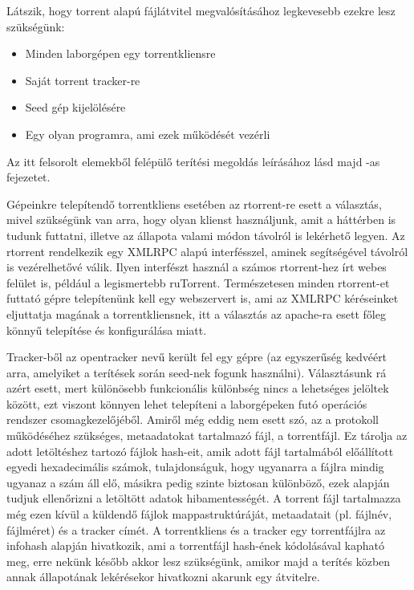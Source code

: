 Látszik, hogy torrent alapú fájlátvitel megvalósításához legkevesebb ezekre lesz szükségünk:
\begin{itemize}
	\item Minden laborgépen egy torrentkliensre
	\item Saját torrent tracker-re
	\item Seed gép kijelölésére
	\item Egy olyan programra, ami ezek működését vezérli
\end{itemize}
Az itt felsorolt elemekből felépülő terítési megoldás leírásához lásd majd -as fejezetet. 

Gépeinkre telepítendő torrentkliens esetében az rtorrent-re\cite{sundell2012libtorrent} esett a választás, mivel szükségünk van arra, hogy olyan klienst használjunk, amit a háttérben is tudunk futtatni, illetve az állapota valami módon távolról is lekérhető legyen. Az rtorrent rendelkezik egy XMLRPC\cite{merrick2006xml} alapú interfésszel, aminek segítségével távolról is vezérelhetővé válik. Ilyen interfészt használ a számos rtorrent-hez írt webes felület is, például a legismertebb ruTorrent\cite{rutorrent}. Természetesen minden rtorrent-et futtató gépre telepítenünk kell egy webszervert is, ami az XMLRPC kéréseinket eljuttatja magának a torrentkliensnek, itt a választás az apache-ra\cite{fielding1997apache} esett főleg könnyű telepítése és konfigurálása miatt.

Tracker-ből az opentracker nevű került fel egy gépre (az egyszerűség kedvéért arra, amelyiket a terítések során seed-nek fogunk használni). Választásunk rá azért esett, mert különösebb funkcionális különbség nincs a lehetséges jelöltek között, ezt viszont könnyen lehet telepíteni a laborgépeken futó operációs rendszer csomagkezelőjéből. Amiről még eddig nem esett szó, az a protokoll működéséhez szükséges, metaadatokat tartalmazó fájl, a torrentfájl. Ez tárolja az adott letöltéshez tartozó fájlok hash-eit, amik adott fájl tartalmából előállított egyedi hexadecimális számok, tulajdonságuk, hogy ugyanarra a fájlra mindig ugyanaz a szám áll elő, másikra pedig szinte biztosan különböző, ezek alapján tudjuk ellenőrizni a letöltött adatok hibamentességét. A torrent fájl tartalmazza még ezen kívül a küldendő fájlok mappastruktúráját, metaadatait (pl. fájlnév, fájlméret) és a tracker címét. A torrentkliens és a tracker egy torrentfájlra az infohash alapján hivatkozik, ami a torrentfájl hash-ének kódolásával kapható meg, erre nekünk később akkor lesz szükségünk, amikor majd a terítés közben annak állapotának lekérésekor hivatkozni akarunk egy átvitelre.

